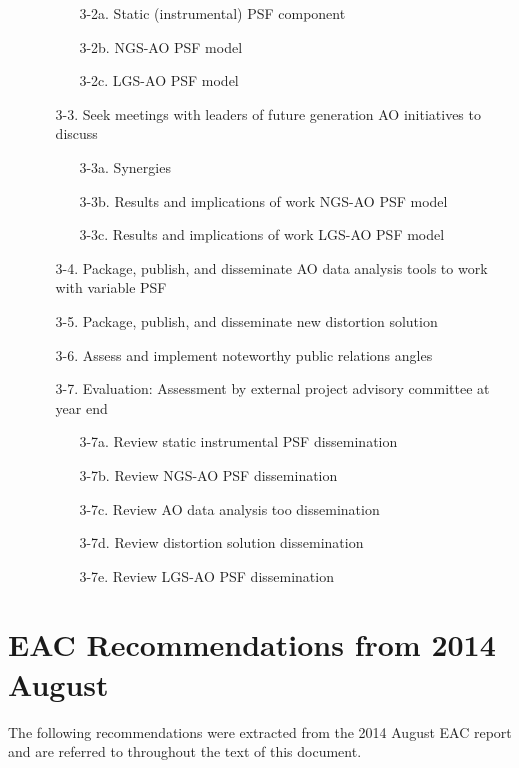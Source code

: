 \begin{itemize}
\begin{itemize}
\begin{itemize}
    \item[3-2a.] Static (instrumental) PSF component
    \item[3-2b.] NGS-AO PSF model
    \item[3-2c.] LGS-AO PSF model
    \end{itemize}
  \item[3-3.] Seek meetings with leaders of future generation AO
    initiatives to discuss
    \begin{itemize}
    \item[3-3a.] Synergies
    \item[3-3b.] Results and implications of work NGS-AO PSF model 
    \item[3-3c.] Results and implications of work LGS-AO PSF model
    \end{itemize}
  \item[3-4.] Package, publish, and disseminate AO data analysis tools
    to work with variable PSF
  \item[3-5.] Package, publish, and disseminate new distortion solution
  \item[3-6.] Assess and implement noteworthy public relations angles
  \item[3-7.] Evaluation: Assessment by external project advisory
    committee at year end 
    \begin{itemize}
    \item[3-7a.] Review static instrumental PSF dissemination
    \item[3-7b.] Review NGS-AO PSF dissemination
    \item[3-7c.] Review AO data analysis too dissemination
    \item[3-7d.] Review distortion solution dissemination
    \item[3-7e.] Review LGS-AO PSF dissemination
    \end{itemize}
  \end{itemize}
\end{itemize}
    

\section{EAC Recommendations from 2014 August}  
\label{app:eac_recommend}

The following recommendations were extracted from the 2014 August EAC
report and are referred to throughout the text of this document.

